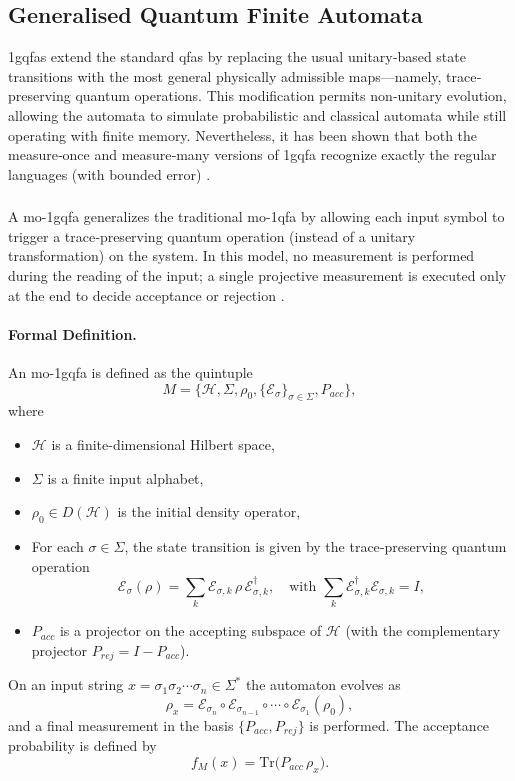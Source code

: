 \subsection{Generalised Quantum Finite Automata}
\label{sec:generalised-qfa}
\glspl{1gqfa} extend the standard \glspl{qfa} by replacing the usual unitary‐based state transitions with the most general physically admissible maps—namely, trace‐preserving quantum operations. This modification permits non‐unitary evolution, allowing the automata to simulate probabilistic and classical automata while still operating with finite memory. Nevertheless, it has been shown that both the measure‐once and measure‐many versions of \gls{1gqfa} recognize exactly the regular languages (with bounded error) \cite{li2012characterizations}.

\subsubsection{}
A \gls{mo-1gqfa} generalizes the traditional \gls{mo-1qfa} by allowing each input symbol to trigger a trace‐preserving quantum operation (instead of a unitary transformation) on the system. In this model, no measurement is performed during the reading of the input; a single projective measurement is executed only at the end to decide acceptance or rejection \cite{li2012characterizations}.

\paragraph{Formal Definition.}  
An \gls{mo-1gqfa} is defined as the quintuple
\[
M = \{ \mathcal{H},\Sigma,\rho_0,\{\mathcal{E}_\sigma\}_{\sigma\in\Sigma},P_{acc}\},
\]
where
\begin{itemize}
  \item $\mathcal{H}$ is a finite-dimensional Hilbert space,
  \item $\Sigma$ is a finite input alphabet,
  \item $\rho_0\in D(\mathcal{H})$ is the initial density operator,
  \item For each $\sigma\in\Sigma$, the state transition is given by the trace‐preserving quantum operation 
  \[
  \mathcal{E}_\sigma(\rho)=\sum_{k} \mathcal{E}_{\sigma,k}\,\rho\,\mathcal{E}_{\sigma,k}^\dagger,\quad \text{with } \sum_{k} \mathcal{E}_{\sigma,k}^\dagger \mathcal{E}_{\sigma,k}=I,
  \]
  \item $P_{acc}$ is a projector on the accepting subspace of $\mathcal{H}$ (with the complementary projector $P_{rej}=I-P_{acc}$).
\end{itemize}
On an input string $x=\sigma_1\sigma_2\cdots\sigma_n\in\Sigma^*$ the automaton evolves as
\[
\rho_x = \mathcal{E}_{\sigma_n}\circ \mathcal{E}_{\sigma_{n-1}}\circ\cdots\circ \mathcal{E}_{\sigma_1}(\rho_0),
\]
and a final measurement in the basis $\{P_{acc},P_{rej}\}$ is performed. The acceptance probability is defined by
\[
f_M(x)=\mathrm{Tr}\bigl(P_{acc}\,\rho_x\bigr).
\]

